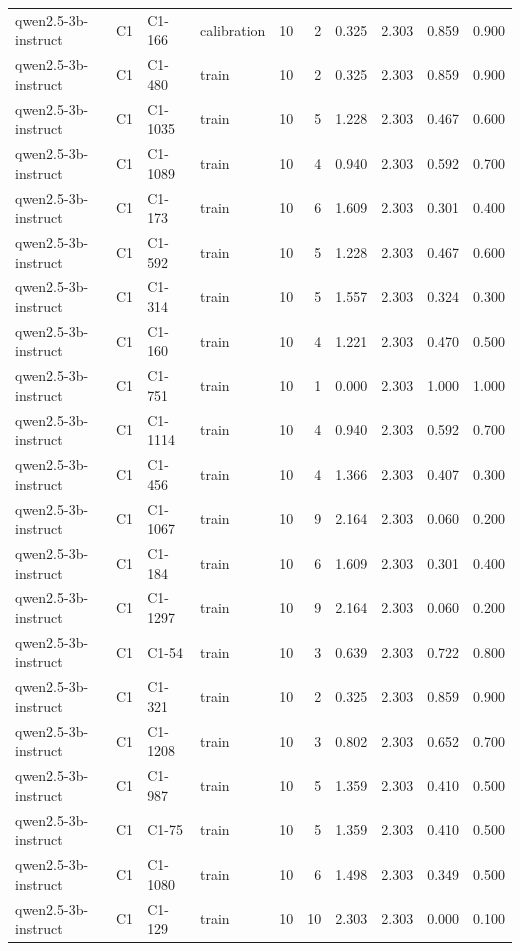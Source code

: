 \begin{table}
\begin{tabular}{llllrrrrrr}
qwen2.5-3b-instruct & C1 & C1-166 & calibration & 10 & 2 & 0.325 & 2.303 & 0.859 & 0.900 \\
qwen2.5-3b-instruct & C1 & C1-480 & train & 10 & 2 & 0.325 & 2.303 & 0.859 & 0.900 \\
qwen2.5-3b-instruct & C1 & C1-1035 & train & 10 & 5 & 1.228 & 2.303 & 0.467 & 0.600 \\
qwen2.5-3b-instruct & C1 & C1-1089 & train & 10 & 4 & 0.940 & 2.303 & 0.592 & 0.700 \\
qwen2.5-3b-instruct & C1 & C1-173 & train & 10 & 6 & 1.609 & 2.303 & 0.301 & 0.400 \\
qwen2.5-3b-instruct & C1 & C1-592 & train & 10 & 5 & 1.228 & 2.303 & 0.467 & 0.600 \\
qwen2.5-3b-instruct & C1 & C1-314 & train & 10 & 5 & 1.557 & 2.303 & 0.324 & 0.300 \\
qwen2.5-3b-instruct & C1 & C1-160 & train & 10 & 4 & 1.221 & 2.303 & 0.470 & 0.500 \\
qwen2.5-3b-instruct & C1 & C1-751 & train & 10 & 1 & 0.000 & 2.303 & 1.000 & 1.000 \\
qwen2.5-3b-instruct & C1 & C1-1114 & train & 10 & 4 & 0.940 & 2.303 & 0.592 & 0.700 \\
qwen2.5-3b-instruct & C1 & C1-456 & train & 10 & 4 & 1.366 & 2.303 & 0.407 & 0.300 \\
qwen2.5-3b-instruct & C1 & C1-1067 & train & 10 & 9 & 2.164 & 2.303 & 0.060 & 0.200 \\
qwen2.5-3b-instruct & C1 & C1-184 & train & 10 & 6 & 1.609 & 2.303 & 0.301 & 0.400 \\
qwen2.5-3b-instruct & C1 & C1-1297 & train & 10 & 9 & 2.164 & 2.303 & 0.060 & 0.200 \\
qwen2.5-3b-instruct & C1 & C1-54 & train & 10 & 3 & 0.639 & 2.303 & 0.722 & 0.800 \\
qwen2.5-3b-instruct & C1 & C1-321 & train & 10 & 2 & 0.325 & 2.303 & 0.859 & 0.900 \\
qwen2.5-3b-instruct & C1 & C1-1208 & train & 10 & 3 & 0.802 & 2.303 & 0.652 & 0.700 \\
qwen2.5-3b-instruct & C1 & C1-987 & train & 10 & 5 & 1.359 & 2.303 & 0.410 & 0.500 \\
qwen2.5-3b-instruct & C1 & C1-75 & train & 10 & 5 & 1.359 & 2.303 & 0.410 & 0.500 \\
qwen2.5-3b-instruct & C1 & C1-1080 & train & 10 & 6 & 1.498 & 2.303 & 0.349 & 0.500 \\
qwen2.5-3b-instruct & C1 & C1-129 & train & 10 & 10 & 2.303 & 2.303 & 0.000 & 0.100 \\

\end{tabular}
\end{table}
